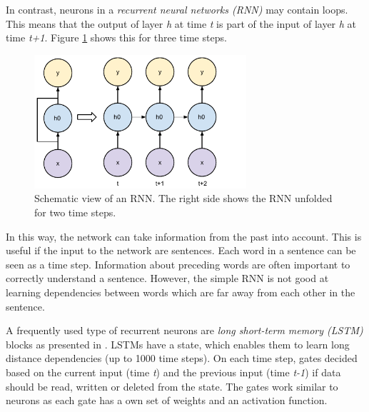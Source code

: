 In contrast, neurons in a \emph{recurrent neural networks (RNN)} may contain loops. This means that the output of layer \emph{h} at time \emph{t} is part of the input of layer \emph{h} at time \emph{t+1}. Figure \ref{fig:rnnschema} shows this for three time steps.


\begin{figure}[ht]
\centering
	\includegraphics[width=0.7\textwidth]{images/rnn_schema}
	\caption{Schematic view of an RNN. The right side shows the RNN unfolded for two time steps.}
		\label{fig:rnnschema}
\end{figure}

In this way, the network can take information from the past into account. This is useful if the input to the network are sentences. Each word in a sentence can be seen as a time step. Information about preceding words are often important to correctly understand a sentence. However, the simple RNN is not good at learning dependencies between words which are far away from each other in the sentence.

A frequently used type of recurrent neurons are \emph{long short-term memory (LSTM)} blocks as presented in \cite{hochreiter1997long}. LSTMs have a state, which enables them to learn long distance dependencies (up to 1000 time steps). On each time step, gates decided based on the current input (time \emph{t}) and the previous input (time \emph{t-1}) if data should be read, written or deleted from the state. The gates work similar to neurons as each gate has a own set of weights and an activation function.

%
%
%
%


